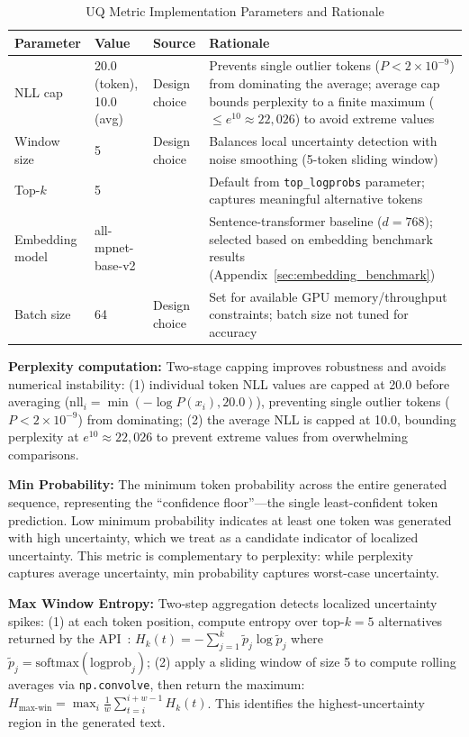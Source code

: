 \begin{table}[H]
\centering
\caption{UQ Metric Implementation Parameters and Rationale}
\label{tab:uq_params}
\footnotesize
\begin{tabularx}{\textwidth}{@{}l l l X@{}}
\toprule
\textbf{Parameter} & \textbf{Value} & \textbf{Source} & \textbf{Rationale} \\
\midrule
NLL cap & 20.0 (token), 10.0 (avg) & Design choice & Prevents single outlier tokens ($P < 2 \times 10^{-9}$) from dominating the average; average cap bounds perplexity to a finite maximum ($\leq e^{10} \approx 22{,}026$) to avoid extreme values \\
Window size & 5 & Design choice & Balances local uncertainty detection with noise smoothing (5-token sliding window) \\
Top-$k$ & 5 & \cite{openai2024api} & Default from \texttt{top\_logprobs} parameter; captures meaningful alternative tokens \\
Embedding model & all-mpnet-base-v2 & \cite{muennighoff2023mteb} & Sentence-transformer baseline ($d=768$); selected based on embedding benchmark results (Appendix~\ref{sec:embedding_benchmark}) \\
Batch size & 64 & Design choice & Set for available GPU memory/throughput constraints; batch size not tuned for accuracy \\
\bottomrule
\end{tabularx}
\end{table}

\textbf{Perplexity computation:} Two-stage capping improves robustness and avoids numerical instability: (1) individual token NLL values are capped at 20.0 before averaging ($\text{nll}_i = \min(-\log P(x_i), 20.0)$), preventing single outlier tokens ($P < 2 \times 10^{-9}$) from dominating; (2) the average NLL is capped at 10.0, bounding perplexity at $e^{10} \approx 22{,}026$ to prevent extreme values from overwhelming comparisons.

\textbf{Min Probability:} The minimum token probability across the entire generated sequence, representing the ``confidence floor''---the single least-confident token prediction. Low minimum probability indicates at least one token was generated with high uncertainty, which we treat as a candidate indicator of localized uncertainty. This metric is complementary to perplexity: while perplexity captures average uncertainty, min probability captures worst-case uncertainty.

\textbf{Max Window Entropy:} Two-step aggregation detects localized uncertainty spikes: (1) at each token position, compute entropy over top-$k=5$ alternatives returned by the API~\cite{openai2024api}: $H_k(t) = -\sum_{j=1}^{k} \tilde{p}_j \log \tilde{p}_j$ where $\tilde{p}_j = \text{softmax}(\text{logprob}_j)$; (2) apply a sliding window of size 5 to compute rolling averages via \texttt{np.convolve}, then return the maximum: $H_{\text{max-win}} = \max_i \frac{1}{w}\sum_{t=i}^{i+w-1} H_k(t)$. This identifies the highest-uncertainty region in the generated text.

